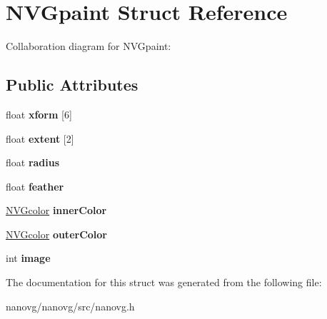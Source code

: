 \hypertarget{struct_n_v_gpaint}{\section{N\+V\+Gpaint Struct Reference}
\label{struct_n_v_gpaint}
}


Collaboration diagram for N\+V\+Gpaint\+:
\subsection*{Public Attributes}
\begin{DoxyCompactItemize}
\item 
\hypertarget{struct_n_v_gpaint_a2f486f2a6c76c0fd46a6ea58aa587194}{float {\bfseries xform} \mbox{[}6\mbox{]}}\label{struct_n_v_gpaint_a2f486f2a6c76c0fd46a6ea58aa587194}

\item 
\hypertarget{struct_n_v_gpaint_ac70c34226c6bd29053cc8bfb29bc8dd0}{float {\bfseries extent} \mbox{[}2\mbox{]}}\label{struct_n_v_gpaint_ac70c34226c6bd29053cc8bfb29bc8dd0}

\item 
\hypertarget{struct_n_v_gpaint_a796f17e83ffd2f59d7a48a5c0e062c55}{float {\bfseries radius}}\label{struct_n_v_gpaint_a796f17e83ffd2f59d7a48a5c0e062c55}

\item 
\hypertarget{struct_n_v_gpaint_abab7d2a8c04a8964f8e3bf25d2c523af}{float {\bfseries feather}}\label{struct_n_v_gpaint_abab7d2a8c04a8964f8e3bf25d2c523af}

\item 
\hypertarget{struct_n_v_gpaint_a86f3ba7ef3436b55c260606e99461df6}{\hyperlink{struct_n_v_gcolor}{N\+V\+Gcolor} {\bfseries inner\+Color}}\label{struct_n_v_gpaint_a86f3ba7ef3436b55c260606e99461df6}

\item 
\hypertarget{struct_n_v_gpaint_aed8916661dc274a016646f92f5b2e64a}{\hyperlink{struct_n_v_gcolor}{N\+V\+Gcolor} {\bfseries outer\+Color}}\label{struct_n_v_gpaint_aed8916661dc274a016646f92f5b2e64a}

\item 
\hypertarget{struct_n_v_gpaint_ab6baf3fc279d73bf2de69390e8eb05d2}{int {\bfseries image}}\label{struct_n_v_gpaint_ab6baf3fc279d73bf2de69390e8eb05d2}

\end{DoxyCompactItemize}


The documentation for this struct was generated from the following file\+:\begin{DoxyCompactItemize}
\item 
nanovg/nanovg/src/nanovg.\+h\end{DoxyCompactItemize}
